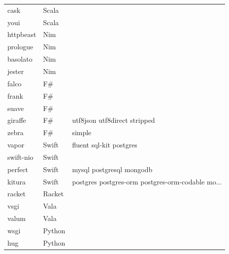 \begin{longtable}{lll}
    cask             & Scala       &                                                    \\
    youi             & Scala       &                                                    \\
    httpbeast        & Nim         &                                                    \\
    prologue         & Nim         &                                                    \\
    basolato         & Nim         &                                                    \\
    jester           & Nim         &                                                    \\
    falco            & F\#         &                                                    \\
    frank            & F\#         &                                                    \\
    suave            & F\#         &                                                    \\
    giraffe          & F\#         & utf8json utf8direct stripped                       \\
    zebra            & F\#         & simple                                             \\
    vapor            & Swift       & fluent sql-kit postgres                            \\
    swift-nio        & Swift       &                                                    \\
    perfect          & Swift       & mysql postgresql mongodb                           \\
    kitura           & Swift       & postgres postgres-orm postgres-orm-codable mo...   \\
    racket           & Racket      &                                                    \\
    vsgi             & Vala        &                                                    \\
    valum            & Vala        &                                                    \\
    wsgi             & Python      &                                                    \\
    hug              & Python      &                                                    \\

\end{longtable}
